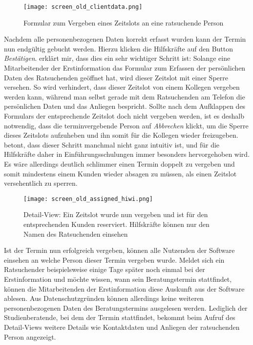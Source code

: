 \begin{figure}[H]
    \caption{Formular zum Vergeben eines Zeitslots an eine ratsuchende Person}
    \centering
    \texttt{[image: screen\_old\_clientdata.png]}
\end{figure}

Nachdem alle personenbezogenen Daten korrekt erfasst wurden kann der Termin nun
endgültig gebucht werden. Hierzu klicken die Hilfskräfte auf den Button
\textit{Bestätigen}. \ipName erklärt mir, dass dies ein sehr wichtiger Schritt
ist: Solange eine Mitarbeitender der Erstinformation das Formular zum Erfassen
der persönlichen Daten des Ratsuchenden geöffnet hat, wird dieser Zeitslot mit
einer Sperre versehen. So wird verhindert, dass dieser Zeitslot von einem
Kollegen vergeben werden kann, während man selbst gerade mit dem Ratsuchenden
am Telefon die persönlichen Daten und das Anliegen bespricht. Sollte nach dem
Aufklappen des Formulars der entsprechende Zeitslot doch nicht vergeben werden,
ist es deshalb notwendig, dass die terminvergebende Person auf
\textit{Abbrechen} klickt, um die Sperre dieses Zeitslots aufzuheben und ihn
somit für die Kollegen wieder freizugeben. \ipName betont, dass dieser Schritt
manchmal nicht ganz intuitiv ist, und für die Hilfskräfte daher in
Einführungsschulungen immer besonders hervorgehoben wird. Es wäre allerdings
deutlich schlimmer einen Termin doppelt zu vergeben und somit mindestens einem
Kunden wieder absagen zu müssen, als einen Zeitslot versehentlich zu sperren.

\begin{figure}[H]
    \caption{Detail-View: Ein Zeitslot wurde nun vergeben und ist für den entsprechenden Kunden reserviert. Hilfskräfte können nur den Namen des Ratsuchenden einsehen}
    \centering
    \texttt{[image: screen\_old\_assigned\_hiwi.png]}
\end{figure}

Ist der Termin nun erfolgreich vergeben, können alle Nutzenden der Software
einsehen an welche Person dieser Termin vergeben wurde. Meldet sich ein
Ratsuchender beispielsweise einige Tage später noch einmal bei der
Erstinformation und möchte wissen, wann sein Beratungstermin stattfindet,
können die Mitarbeitenden der Erstinformation diese Auskunft aus der Software
ablesen. Aus Datenschutzgründen können allerdings keine weiteren
personenbezogenen Daten des Beratungstermins ausgelesen werden. Lediglich der
Studienberatende, bei dem der Termin stattfindet, bekommt beim Aufruf des
Detail-Views weitere Details wie Kontaktdaten und Anliegen der ratsuchenden
Person angezeigt.

